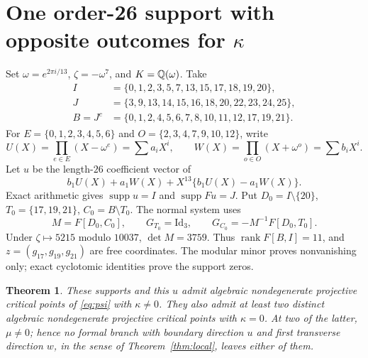 \documentclass[11pt]{article}
\newtheorem{theorem}{Theorem}[section]
\theoremstyle{remark}\newtheorem{remark}[theorem]{Remark}
\DeclareMathOperator{\supp}{supp}
\DeclareMathOperator{\rank}{rank}
\begin{document}
\section{One order-26 support with opposite outcomes for \texorpdfstring{$\kappa$}{kappa}}
Set $\omega=e^{2\pi i/13}$, $\zeta=-\omega^7$, and $K=\mathbb Q(\omega)$. Take
\begin{align*}
 I&=\{0,1,2,3,5,7,13,15,17,18,19,20\},\\
 J&=\{3,9,13,14,15,16,18,20,22,23,24,25\},\\
 B=J^c&=\{0,1,2,4,5,6,7,8,10,11,12,17,19,21\}.
\end{align*}
For $E=\{0,1,2,3,4,5,6\}$ and $O=\{2,3,4,7,9,10,12\}$, write
\[
 U(X)=\prod_{e\in E}(X-\omega^e)=\sum a_iX^i,\qquad
 W(X)=\prod_{o\in O}(X+\omega^o)=\sum b_iX^i.
\]
Let $u$ be the length-$26$ coefficient vector of
\[
 b_1U(X)+a_1W(X)+X^{13}\{b_1U(X)-a_1W(X)\}.
\]
Exact arithmetic gives $\supp u=I$ and $\supp Fu=J$.
Put $D_0=I\setminus\{20\}$, $T_0=\{17,19,21\}$, $C_0=B\setminus T_0$.
The normal system uses
\begin{equation}\label{eq:Gexplicit}
 M=F[D_0,C_0],\qquad G_{T_0}=\mathrm{Id}_3,\qquad
 G_{C_0}=-M^{-1}F[D_0,T_0].
\end{equation}
Under $\zeta\mapsto5215$ modulo $10037$, $\det M=3759$.
Thus $\rank F[B,I]=11$, and $z=(g_{17},g_{19},g_{21})$ are free
coordinates. The modular minor proves nonvanishing only; exact cyclotomic
identities prove the support zeros.

\begin{theorem}\label{thm:26}
These supports and this $u$ admit algebraic nondegenerate projective
critical points of \eqref{eq:psi} with $\kappa\ne0$. They also admit
at least two distinct algebraic nondegenerate projective critical points with
$\kappa=0$. At two of the latter, $\mu\ne0$; hence no formal branch with
boundary direction $u$ and first transverse direction $w$, in the sense of
Theorem~\ref{thm:local}, leaves either of them.
\end{theorem}
\end{document}
